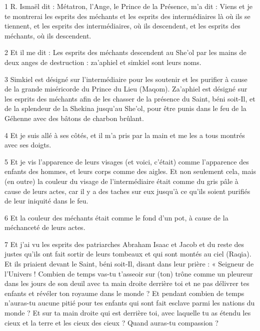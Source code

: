 \par 1 R. Ismaël dit : Métatron, l'Ange, le Prince de la Présence, m'a dit : Viens et je te montrerai les esprits des méchants et les esprits des intermédiaires là où ils se tiennent, et les esprits des intermédiaires, où ils descendent, et les esprits des méchants, où ils descendent.

\par 2 Et il me dit : Les esprits des méchants descendent au She'ol par les mains de deux anges de destruction : za'aphiel et simkiel sont leurs noms.

\par 3 Simkiel est désigné sur l'intermédiaire pour les soutenir et les purifier à cause de la grande miséricorde du Prince du Lieu (Maqom). Za'aphiel est désigné sur les esprits des méchants afin de les chasser de la présence du Saint, béni soit-Il, et de la splendeur de la Shekina jusqu'au She'ol, pour être punis dans le feu de la Géhenne avec des bâtons de charbon brûlant.

\par 4 Et je suis allé à ses côtés, et il m'a pris par la main et me les a tous montrés avec ses doigts.

\par 5 Et je vis l'apparence de leurs visages (et voici, c'était) comme l'apparence des enfants des hommes, et leurs corps comme des aigles. Et non seulement cela, mais (en outre) la couleur du visage de l'intermédiaire était comme du gris pâle à cause de leurs actes, car il y a des taches sur eux jusqu'à ce qu'ils soient purifiés de leur iniquité dans le feu.

\par 6 Et la couleur des méchants était comme le fond d'un pot, à cause de la méchanceté de leurs actes.

\par 7 Et j'ai vu les esprits des patriarches Abraham Isaac et Jacob et du reste des justes qu'ils ont fait sortir de leurs tombeaux et qui sont montés au ciel (Raqia). Et ils priaient devant le Saint, béni soit-Il, disant dans leur prière : « Seigneur de l'Univers ! Combien de temps vas-tu t'asseoir sur (ton) trône comme un pleureur dans les jours de son deuil avec ta main droite derrière toi et ne pas délivrer tes enfants et révéler ton royaume dans le monde ? Et pendant combien de temps n'auras-tu aucune pitié pour tes enfants qui sont fait esclave parmi les nations du monde ? Et sur ta main droite qui est derrière toi, avec laquelle tu as étendu les cieux et la terre et les cieux des cieux ? Quand auras-tu compassion ?

